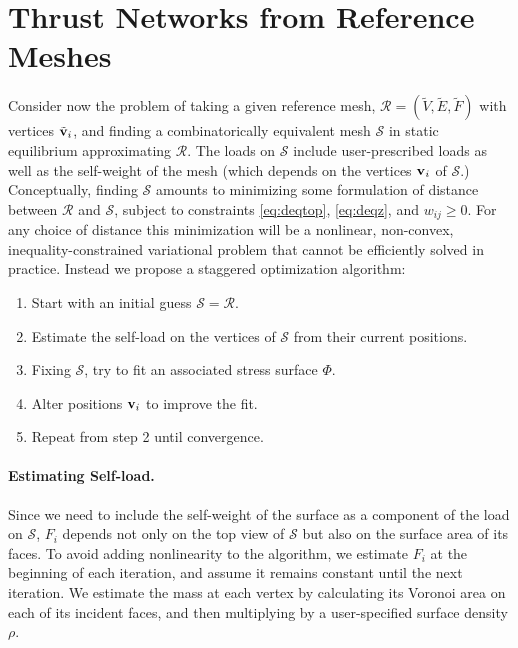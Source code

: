 \documentclass[annual]{acmsiggraph}
\def\SS{{\mathcal S}}
\def\RR{{\mathcal R}}
\begin{document}
\section{Thrust Networks from Reference Meshes} \label{sec:opt} Consider 
now the problem of taking a given reference mesh, $\RR = 
(\tilde{V},\tilde{E},\tilde{F})$ with vertices $\tilde{{\mathbf v}}_i$, and 
finding a combinatorically equivalent mesh $\SS$ in static equilibrium 
approximating $\RR$. The loads on $\SS$ include user-prescribed loads as 
well as the self-weight of the mesh (which depends on the vertices ${\mathbf v}_i$ 
of $\SS$.) Conceptually, finding $\SS$ amounts to minimizing some 
formulation of distance between $\RR$ and $\SS$, subject to constraints 
\eqref{eq:deqtop}, \eqref{eq:deqz}, and $w_{ij} \geq 0$. For any choice of 
distance this minimization will be a nonlinear, non-convex, 
inequality-constrained variational problem that cannot be efficiently 
solved in practice. Instead we propose a staggered optimization algorithm:

\begin{enumerate}\itemsep-\parsep

\item Start with an initial guess $\SS = \RR$.

\item Estimate the self-load on the vertices of $\SS$ from their current 
positions.

\item Fixing $\SS$, try to fit an associated stress surface $\Phi$.

\item Alter positions ${\mathbf v}_i$ to improve the fit.

\item Repeat from step 2 until convergence.

\end{enumerate}

\paragraph{Estimating Self-load.}

Since we need to include the self-weight of the surface as a component of 
the load on $\SS$, $F_i$ depends not only on the top view of $\SS$ but 
also on the surface area of its faces. To avoid adding nonlinearity to the 
algorithm, we estimate $F_i$ at the beginning of each iteration, and 
assume it remains constant until the next iteration. We estimate the mass 
at each vertex by calculating its Voronoi area on each of its incident 
faces, and then multiplying by a user-specified surface density $\rho$.
\end{document}
